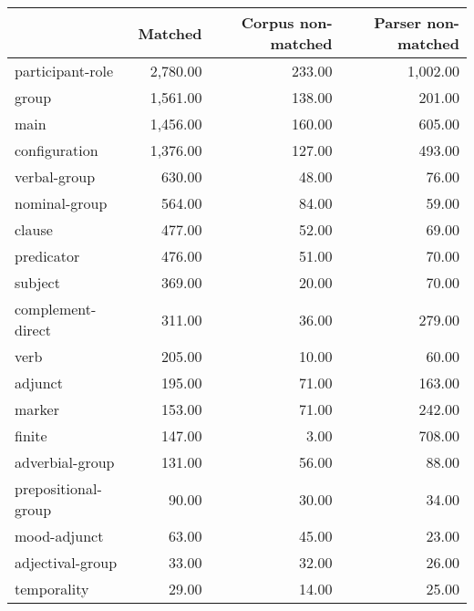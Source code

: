 \begin{table}[!ht]
\centering
\begin{tabular}{lrrr}
\toprule
{} &  Matched &  Corpus non-matched &  Parser non-matched \\
\midrule
participant-role          & 2,780.00 &              233.00 &            1,002.00 \\
group                     & 1,561.00 &              138.00 &              201.00 \\
main                      & 1,456.00 &              160.00 &              605.00 \\
configuration             & 1,376.00 &              127.00 &              493.00 \\
verbal-group              &   630.00 &               48.00 &               76.00 \\
nominal-group             &   564.00 &               84.00 &               59.00 \\
clause                    &   477.00 &               52.00 &               69.00 \\
predicator                &   476.00 &               51.00 &               70.00 \\
subject                   &   369.00 &               20.00 &               70.00 \\
complement-direct         &   311.00 &               36.00 &              279.00 \\
verb                      &   205.00 &               10.00 &               60.00 \\
adjunct                   &   195.00 &               71.00 &              163.00 \\
marker                    &   153.00 &               71.00 &              242.00 \\
finite                    &   147.00 &                3.00 &              708.00 \\
adverbial-group           &   131.00 &               56.00 &               88.00 \\
prepositional-group       &    90.00 &               30.00 &               34.00 \\
mood-adjunct              &    63.00 &               45.00 &               23.00 \\
adjectival-group          &    33.00 &               32.00 &               26.00 \\
temporality               &    29.00 &               14.00 &               25.00 \\

\end{tabular}
\end{table}
